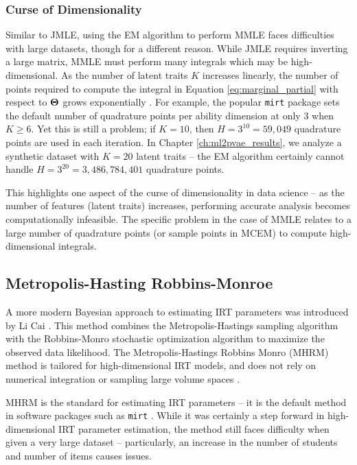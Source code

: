 \subsubsection{Curse of Dimensionality} \label{sec:dim}
Similar to JMLE, using the EM algorithm to perform MMLE faces difficulties with large datasets, though for a different reason. While JMLE requires inverting a large matrix, MMLE must perform many integrals which may be high-dimensional. As the number of latent traits $K$ increases linearly, the number of points required to compute the integral in Equation \ref{eq:marginal_partial} with respect to $\boldsymbol{\Theta}$ grows exponentially \cite{cai2010}. For example, the popular \verb!mirt! package \cite{mirt} sets the default number of quadrature points per ability dimension at only $3$ when $K\geq6$. Yet this is still a problem; if $K=10$, then $H = 3^{10} = 59,049$ quadrature points are used in each iteration. In Chapter \ref{ch:ml2pvae_results}, we analyze a synthetic dataset with $K=20$ latent traits -- the EM algorithm certainly cannot handle $H=3^{20} = 3,486,784,401$ quadrature points.

This highlights one aspect of the curse of dimensionality in data science -- as the number of features (latent traits) increases, performing accurate analysis becomes computationally infeasible. The specific problem in the case of MMLE relates to a large number of quadrature points (or sample points in MCEM) to compute high-dimensional integrals.


\subsection{Metropolis-Hasting Robbins-Monroe}
A more modern Bayesian approach to estimating IRT parameters was introduced by Li Cai \cite{cai2009, cai2010}. This method combines the Metropolis-Hastings sampling algorithm \cite{hastings1970} with the Robbins-Monro stochastic optimization algorithm \cite{robbins1951} to maximize the observed data likelihood. The Metropolis-Hastings Robbins Monro (MHRM) method is tailored for high-dimensional IRT models, and does not rely on numerical integration or sampling large volume spaces \cite{han2014}. 

MHRM is the standard for estimating IRT parameters -- it is the default method in software packages such as \verb!mirt! \cite{mirt}. While it was certainly a step forward in high-dimensional IRT parameter estimation, the method still faces difficulty when given a very large dataset -- particularly, an increase in the number of students and number of items causes issues.


